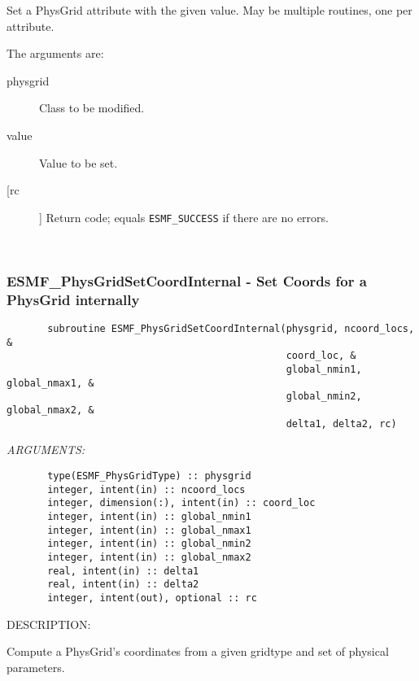        Set a PhysGrid attribute with the given value.
       May be multiple routines, one per attribute.
  
       The arguments are:
       \begin{description}
       \item[physgrid] 
            Class to be modified.
       \item[value]
            Value to be set.         
       \item[[rc]] 
            Return code; equals {\tt ESMF\_SUCCESS} if there are no errors.
       \end{description}
   
 
\mbox{}\hrulefill\ 
 
\subsubsection{ESMF\_PhysGridSetCoordInternal - Set Coords for a PhysGrid internally}


 
\begin{verbatim}       subroutine ESMF_PhysGridSetCoordInternal(physgrid, ncoord_locs, &
                                                coord_loc, &
                                                global_nmin1, global_nmax1, &
                                                global_nmin2, global_nmax2, &
                                                delta1, delta2, rc)\end{verbatim}{\em ARGUMENTS:}
\begin{verbatim}       type(ESMF_PhysGridType) :: physgrid
       integer, intent(in) :: ncoord_locs
       integer, dimension(:), intent(in) :: coord_loc
       integer, intent(in) :: global_nmin1
       integer, intent(in) :: global_nmax1
       integer, intent(in) :: global_nmin2
       integer, intent(in) :: global_nmax2
       real, intent(in) :: delta1
       real, intent(in) :: delta2
       integer, intent(out), optional :: rc            
 \end{verbatim}
{\sf DESCRIPTION:\\ }


       Compute a PhysGrid's coordinates from a given gridtype and set of
       physical parameters.
  
